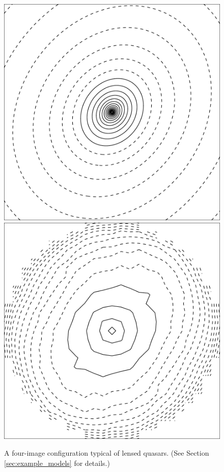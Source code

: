 \begin{figure}
  \includegraphics[width=\myplotswidth]{fig/ASW0001hpf_006915_kappa}
  \includegraphics[width=\myplotswidth]{fig/006915_mass}

  \caption[result 6915 (ASW0001hpf)]{A four-image configuration
    typical of lensed quasars. (See Section \ref{sec:example_models}
    for details.)}
  \label{fig:6915}
\end{figure}


